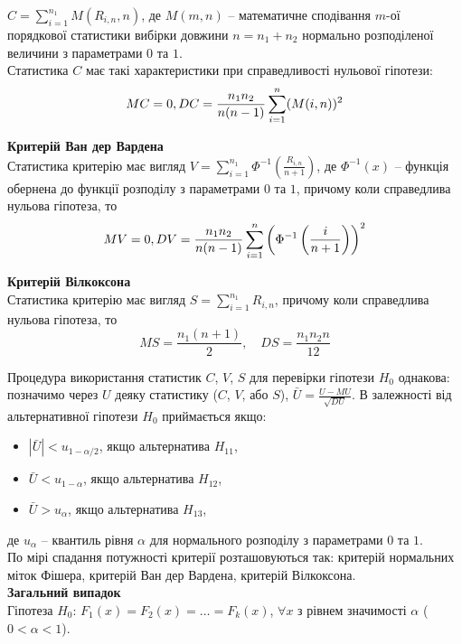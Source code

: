 $C = \sum_{i=1}^{n_1} M(R_{i, n}, n)$, де $M(m, n)$ -- математичне сподівання $m$-ої порядкової статистики вибірки довжини $n = n_1 + n_2$ нормально розподіленої величини з параметрами $0$ та $1$. \\

Статистика $C$ має такі характеристики при справедливості нульової гіпотези:
\[ M C = 0, D C = \dfrac{n_1 n_2}{n(n-1)} \displaystyle\sum\limits_{i=1}^n (M(i, n))^2 \]

\textbf{Критерій Ван дер Вардена} \\

Статистика критерію має вигляд $ V = \sum_{i=1}^{n_1} \Phi^{-1} \left( \frac{R_{i,n}}{n+1} \right)$, де $\Phi^{-1}(x)$ -- функція обернена до функції розподілу з параметрами $0$ та $1$, причому коли справедлива нульова гіпотеза, то
\[ M V = 0, DV = \dfrac{n_1 n_2}{n(n-1)} \displaystyle\sum\limits_{i=1}^n \left( \Phi^{-1} \left( \dfrac{i}{n+1} \right) \right)^2 \]

\textbf{Критерій Вілкоксона} \\

Статистика критерію має вигляд $S = \sum_{i=1}^{n_1} R_{i,n}$, причому коли справедлива нульова гіпотеза, то
\[ MS = \dfrac{n_1(n + 1)}{2}, \quad DS = \dfrac{n_1 n_2 n}{12} \]

Процедура використання статистик $C$, $V$, $S$ для перевірки гіпотези $H_0$ однакова: позначимо через $U$ деяку статистику ($C$, $V$, або $S$), $\bar{U} = \frac{U - M U}{\sqrt{D U}}$. В залежності від альтернативної гіпотези $H_0$ приймається якщо:
\begin{itemize}
    \item $|\bar{U}| < u_{1 - \alpha / 2}$, якщо альтернатива $H_{11}$,
    
    \item $\bar{U} < u_{1 - \alpha}$, якщо альтернатива $H_{12}$,
    
    \item $\bar{U} > u_\alpha$, якщо альтернатива $H_{13}$,
\end{itemize}
де $u_\alpha$ -- квантиль рівня $\alpha$ для нормального розподілу з параметрами $0$ та $1$. \\

По мірі спадання потужності критерії розташовуються так: критерій нормальних міток Фішера, критерій Ван дер Вардена, критерій Вілкоксона. \\

\textbf{Загальний випадок} \\

Гіпотеза $H_0$: $F_1(x) = F_2(x) = \ldots = F_k(x)$, $\forall x$ з рівнем значимості $\alpha$ ($0 < \alpha < 1$). 

